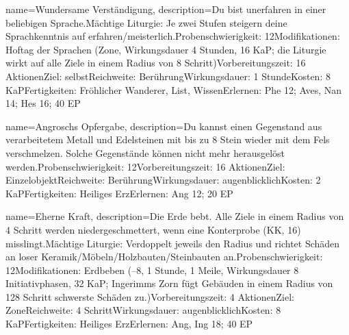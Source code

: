 {
    name={Wundersame Verständigung},
    description={Du bist unerfahren in einer beliebigen Sprache.\newline Mächtige Liturgie: Je zwei Stufen steigern deine Sprachkenntnis auf erfahren/meisterlich.\newline Probenschwierigkeit: 12\newline Modifikationen: Hoftag der Sprachen (Zone, Wirkungsdauer 4 Stunden, 16 KaP; die Liturgie wirkt auf alle Ziele in einem Radius von 8 Schritt)\newline Vorbereitungszeit: 16 Aktionen\newline Ziel: selbst\newline Reichweite: Berührung\newline Wirkungsdauer: 1 Stunde\newline Kosten: 8 KaP\newline Fertigkeiten: Fröhlicher Wanderer, List, Wissen\newline Erlernen: Phe 12; Aves, Nan 14; Hes 16; 40 EP}
}


{
    name={Angroschs Opfergabe},
    description={Du kannst einen Gegenstand aus verarbeitetem Metall und Edelsteinen mit bis zu 8 Stein wieder mit dem Fels verschmelzen. Solche Gegenstände können nicht mehr herausgelöst werden.\newline Probenschwierigkeit: 12\newline Vorbereitungszeit: 16 Aktionen\newline Ziel: Einzelobjekt\newline Reichweite: Berührung\newline Wirkungsdauer: augenblicklich\newline Kosten: 2 KaP\newline Fertigkeiten: Heiliges Erz\newline Erlernen: Ang 12; 20 EP}
}


{
    name={Eherne Kraft},
    description={Die Erde bebt. Alle Ziele in einem Radius von 4 Schritt werden niedergeschmettert, wenn eine Konterprobe (KK, 16) misslingt.\newline Mächtige Liturgie: Verdoppelt jeweils den Radius und richtet Schäden an loser Keramik/Möbeln/Holzbauten/Steinbauten an.\newline Probenschwierigkeit: 12\newline Modifikationen: Erdbeben (–8, 1 Stunde, 1 Meile, Wirkungsdauer 8 Initiativphasen, 32 KaP; Ingerimms Zorn fügt Gebäuden in einem Radius von 128 Schritt schwerste Schäden zu.)\newline Vorbereitungszeit: 4 Aktionen\newline Ziel: Zone\newline Reichweite: 4 Schritt\newline Wirkungsdauer: augenblicklich\newline Kosten: 8 KaP\newline Fertigkeiten: Heiliges Erz\newline Erlernen: Ang, Ing 18; 40 EP}
}


